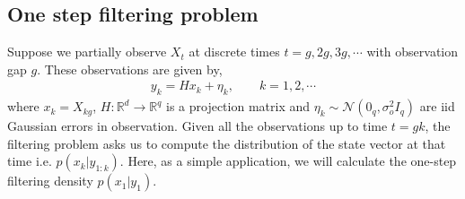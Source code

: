 \subsection{One step filtering problem}\label{ssec-1-filter-prob--dynamic-fp}
Suppose we partially observe $X_t$ at discrete times $t=g, 2g,3g,\cdots$ with observation gap $g$. These observations are given by, 
\begin{align}
    y_k  = Hx_k + \eta_k,\qquad k=1,2,\cdots\label{eq:filtering-obs--dynamic-fp}
\end{align}
where $x_k = X_{kg}$, $H:\mathbb R^d\to\mathbb R^q$ is a projection matrix and $\eta_k\sim\mathcal N(0_q, \sigma_o^2I_q)$ are iid Gaussian errors in observation. Given all the observations up to time $t=gk$, the filtering problem asks us to compute the distribution of the state vector at that time i.e. $p(x_k|y_{1:k})$. Here, as a simple application, we will calculate the one-step filtering density $p(x_1|y_1)$.
